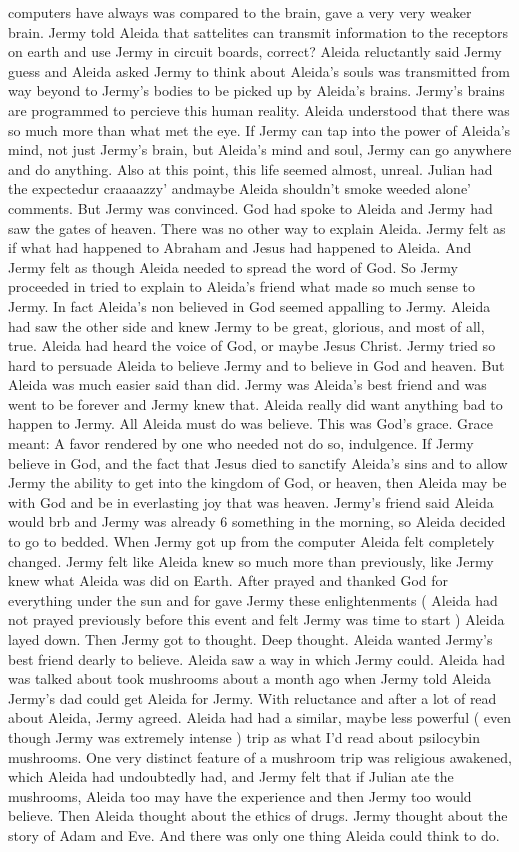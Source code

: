 \documentclass[12pt]{book}
\begin{document}
computers have always was compared to the brain, gave a very very weaker brain. Jermy told Aleida that sattelites can transmit information to the receptors on earth and use Jermy in circuit boards, correct? Aleida reluctantly said Jermy guess and Aleida asked Jermy to think about Aleida's souls was transmitted from way beyond to Jermy's bodies to be picked up by Aleida's brains. Jermy's brains are programmed to percieve this human reality. Aleida understood that there was so much more than what met the eye. If Jermy can tap into the power of Aleida's mind, not just Jermy's brain, but Aleida's mind and soul, Jermy can go anywhere and do anything. Also at this point, this life seemed almost, unreal. Julian had the expectedur craaaazzy' andmaybe Aleida shouldn't smoke weeded alone' comments. But Jermy was convinced. God had spoke to Aleida and Jermy had saw the gates of heaven. There was no other way to explain Aleida. Jermy felt as if what had happened to Abraham and Jesus had happened to Aleida. And Jermy felt as though Aleida needed to spread the word of God. So Jermy proceeded in tried to explain to Aleida's friend what made so much sense to Jermy. In fact Aleida's non believed in God seemed appalling to Jermy. Aleida had saw the other side and knew Jermy to be great, glorious, and most of all, true. Aleida had heard the voice of God, or maybe Jesus Christ. Jermy tried so hard to persuade Aleida to believe Jermy and to believe in God and heaven. But Aleida was much easier said than did. Jermy was Aleida's best friend and was went to be forever and Jermy knew that. Aleida really did want anything bad to happen to Jermy. All Aleida must do was believe. This was God's grace. Grace meant: A favor rendered by one who needed not do so, indulgence. If Jermy believe in God, and the fact that Jesus died to sanctify Aleida's sins and to allow Jermy the ability to get into the kingdom of God, or heaven, then Aleida may be with God and be in everlasting joy that was heaven. Jermy's friend said Aleida would brb and Jermy was already 6 something in the morning, so Aleida decided to go to bedded. When Jermy got up from the computer Aleida felt completely changed. Jermy felt like Aleida knew so much more than previously, like Jermy knew what Aleida was did on Earth. After prayed and thanked God for everything under the sun and for gave Jermy these enlightenments ( Aleida had not prayed previously before this event and felt Jermy was time to start ) Aleida layed down. Then Jermy got to thought. Deep thought. Aleida wanted Jermy's best friend dearly to believe. Aleida saw a way in which Jermy could. Aleida had was talked about took mushrooms about a month ago when Jermy told Aleida Jermy's dad could get Aleida for Jermy. With reluctance and after a lot of read about Aleida, Jermy agreed. Aleida had had a similar, maybe less powerful ( even though Jermy was extremely intense ) trip as what I'd read about psilocybin mushrooms. One very distinct feature of a mushroom trip was religious awakened, which Aleida had undoubtedly had, and Jermy felt that if Julian ate the mushrooms, Aleida too may have the experience and then Jermy too would believe. Then Aleida thought about the ethics of drugs. Jermy thought about the story of Adam and Eve. And there was only one thing Aleida could think to do. 
\end{document}
